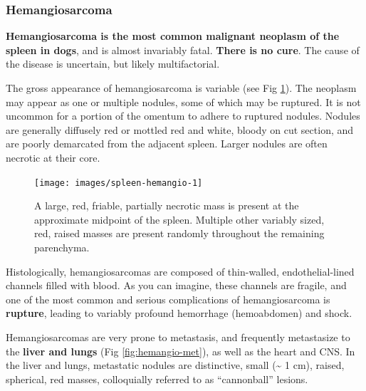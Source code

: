 \documentclass[openany]{article}
\begin{document}
\hypertarget{hemangiosarcoma}{\subsubsection{Hemangiosarcoma}\label{hemangiosarcoma}}

\textbf{Hemangiosarcoma is the most common malignant neoplasm of the
spleen in dogs}, and is almost invariably fatal. \textbf{There is no
cure}. The cause of the disease is uncertain, but likely multifactorial.

The gross appearance of hemangiosarcoma is variable (see Fig
\ref{fig:hemangio}). The neoplasm may appear as one or multiple nodules,
some of which may be ruptured. It is not uncommon for a portion of the
omentum to adhere to ruptured nodules. Nodules are generally diffusely
red or mottled red and white, bloody on cut section, and are poorly
demarcated from the adjacent spleen. Larger nodules are often necrotic
at their core.

\begin{figure}

{\centering \texttt{[image: images/spleen-hemangio-1]} 

}

\caption{A large, red, friable, partially necrotic mass is present at the approximate midpoint of the spleen. Multiple other variably sized, red, raised masses are present randomly throughout the remaining parenchyma.}\label{fig:hemangio}
\end{figure}

Histologically, hemangiosarcomas are composed of thin-walled,
endothelial-lined channels filled with blood. As you can imagine, these
channels are fragile, and one of the most common and serious
complications of hemangiosarcoma is \textbf{rupture}, leading to
variably profound hemorrhage (hemoabdomen) and shock.

Hemangiosarcomas are very prone to metastasis, and frequently
metastasize to the \textbf{liver and lungs} (Fig
\ref{fig:hemangio-met}), as well as the heart and CNS. In the liver and
lungs, metastatic nodules are distinctive, small (\textasciitilde{} 1
cm), raised, spherical, red masses, colloquially referred to as
``cannonball'' lesions.
\end{document}

